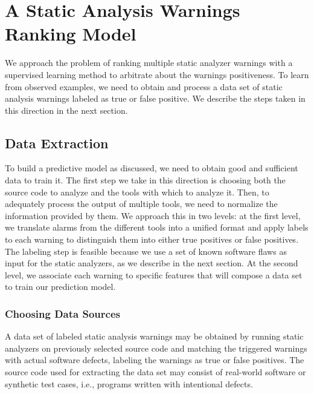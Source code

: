 \chapter{A Static Analysis Warnings Ranking Model}
\label{ch:ranking}

We approach the problem of ranking multiple static analyzer warnings with a
supervised learning method to arbitrate about the warnings positiveness. To
learn from observed examples, we need to obtain and process a data set of static
analysis warnings labeled as true or false positive. We describe the steps taken
in this direction in the next section.

\section{Data Extraction}
\label{sec:data}

To build a predictive model as discussed, we need to obtain good and sufficient
data to train it. The first step we take in this direction is choosing both the
source code to analyze and the tools with which to analyze it. Then, to
adequately process the output of multiple tools, we need to normalize the
information provided by them. We approach this in two levels: at the first
level, we translate alarms from the different tools into a unified format and
apply labels to each warning to distinguish them into either true positives or
false positives. The labeling step is feasible because we use a set of known
software flaws as input for the static analyzers, as we describe in the next
section. At the second level, we associate each warning to specific features
that will compose a data set to train our prediction model.

\subsection{Choosing Data Sources}

A data set of labeled static analysis warnings may be obtained by running
static analyzers on previously selected source code and matching the
triggered warnings with actual software defects, labeling the warnings as true
or false positives. The source code used for extracting the data set may
consist of real-world software or synthetic test cases, i.e., programs written
with intentional defects.

